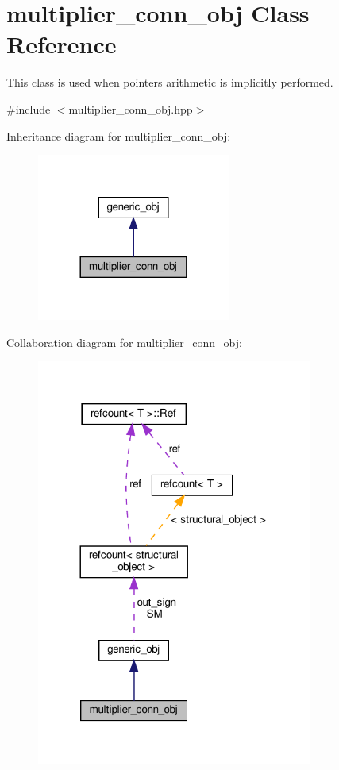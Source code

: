 \hypertarget{classmultiplier__conn__obj}{}\section{multiplier\+\_\+conn\+\_\+obj Class Reference}
\label{classmultiplier__conn__obj}


This class is used when pointers arithmetic is implicitly performed.  




{\ttfamily \#include $<$multiplier\+\_\+conn\+\_\+obj.\+hpp$>$}



Inheritance diagram for multiplier\+\_\+conn\+\_\+obj\+:
\nopagebreak
\begin{figure}[H]
\begin{center}
\leavevmode
\includegraphics[width=180pt]{d4/d8b/classmultiplier__conn__obj__inherit__graph}
\end{center}
\end{figure}


Collaboration diagram for multiplier\+\_\+conn\+\_\+obj\+:
\nopagebreak
\begin{figure}[H]
\begin{center}
\leavevmode
\includegraphics[width=257pt]{dc/d71/classmultiplier__conn__obj__coll__graph}
\end{center}
\end{figure}
